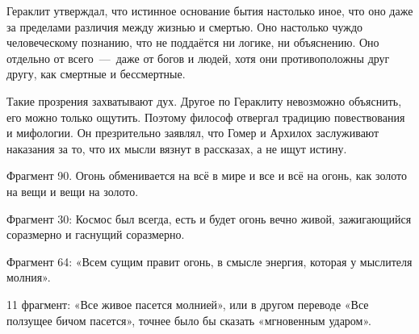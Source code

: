 Гераклит утверждал, что истинное основание бытия настолько иное, что оно даже за пределами различия между жизнью и смертью. Оно настолько чуждо человеческому познанию, что не поддаётся ни логике, ни объяснению. Оно отдельно от всего~---~даже от богов и людей, хотя они противоположны друг другу, как смертные и бессмертные.

Такие прозрения захватывают дух. Другое по Гераклиту невозможно объяснить, его можно только ощутить. Поэтому философ отвергал традицию повествования и мифологии. Он презрительно заявлял, что Гомер и Архилох заслуживают наказания за то, что их мысли вязнут в рассказах, а не ищут истину.

Фрагмент 90. Огонь обменивается на всё в мире и все
и всё на огонь, как золото на вещи и вещи на золото. 

Фрагмент 30: Космос был всегда, есть и будет огонь вечно
живой, зажигающийся соразмерно и гаснущий соразмерно. 

Фрагмент 64: «Всем сущим правит огонь, в смысле энергия, которая у мыслителя молния». 

11 фрагмент: «Все живое пасется молнией», или в другом переводе «Все ползущее бичом пасется», точнее было бы сказать «мгновенным ударом».


